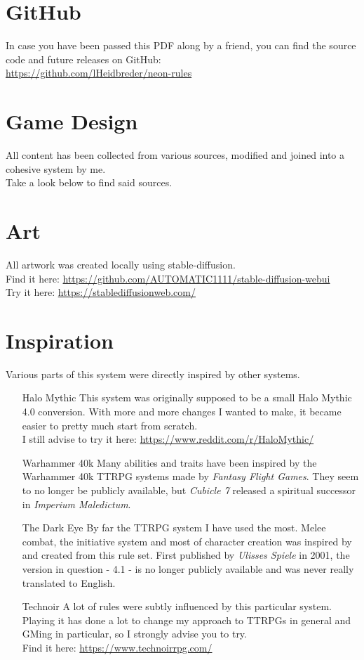 \section*{GitHub}
In case you have been passed this PDF along by a friend, you can find the source code and future releases on GitHub:\\
	\url{https://github.com/lHeidbreder/neon-rules}

\section*{Game Design}
All content has been collected from various sources, modified and joined into a cohesive system by me.\\
Take a look below to find said sources.

\section*{Art}
All artwork was created locally using stable-diffusion.\\
Find it here: \url{https://github.com/AUTOMATIC1111/stable-diffusion-webui}\\
Try it here: \url{https://stablediffusionweb.com/}

\section*{Inspiration}
Various parts of this system were directly inspired by other systems.
\begin{enumerate}
	\item[Halo Mythic] This system was originally supposed to be a small Halo Mythic 4.0 conversion. With more and more changes I wanted to make, it became easier to pretty much start from scratch.\\
		I still advise to try it here: \url{https://www.reddit.com/r/HaloMythic/}
	\item[Warhammer 40k] Many abilities and traits have been inspired by the Warhammer 40k TTRPG systems made by \emph{Fantasy Flight Games}.
	They seem to no longer be publicly available, but \emph{Cubicle 7} released a spiritual successor in \emph{Imperium Maledictum}.
	\item[The Dark Eye] By far the TTRPG system I have used the most. Melee combat, the initiative system and most of character creation was inspired by and created from this rule set.
	First published by \emph{Ulisses Spiele} in 2001, the version in question - 4.1 - is no longer publicly available and was never really translated to English.
	\item[Technoir] A lot of rules were subtly influenced by this particular system. Playing it has done a lot to change my approach to TTRPGs in general and GMing in particular, so I strongly advise you to try.\\
		Find it here: \url{https://www.technoirrpg.com/}
\end{enumerate}


